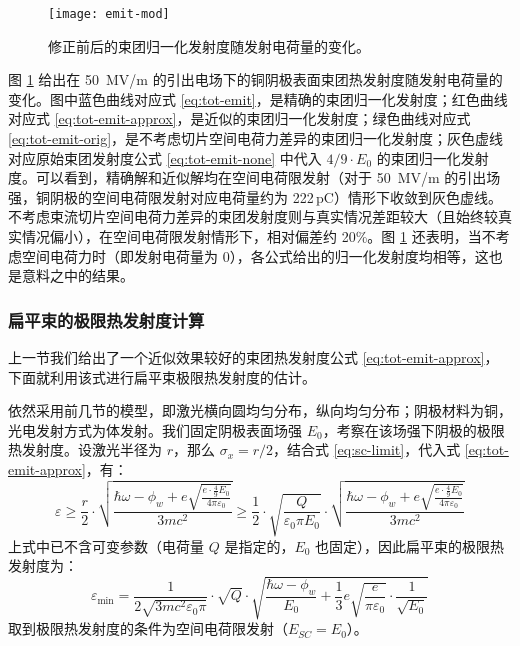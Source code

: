 \begin{figure}[htbp]
\centering
\texttt{[image: emit-mod]}
\caption{\label{fig:emit-mod} 修正前后的束团归一化发射度随发射电荷量的变化。}
\end{figure}

图 \ref{fig:emit-mod} 给出在 \SI{50}{MV/m} 的引出电场下的铜阴极表面束团热发射度随发射电荷量的变化。图中蓝色曲线对应式 \ref{eq:tot-emit}，是精确的束团归一化发射度；红色曲线对应式 \ref{eq:tot-emit-approx}，是近似的束团归一化发射度；绿色曲线对应式 \ref{eq:tot-emit-orig}，是不考虑切片空间电荷力差异的束团归一化发射度；灰色虚线对应原始束团发射度公式 \ref{eq:tot-emit-none} 中代入 $4/9\cdot E_0$ 的束团归一化发射度。可以看到，精确解和近似解均在空间电荷限发射（对于 \SI{50}{MV/m} 的引出场强，铜阴极的空间电荷限发射对应电荷量约为 222\,pC）情形下收敛到灰色虚线。不考虑束流切片空间电荷力差异的束团发射度则与真实情况差距较大（且始终较真实情况偏小），在空间电荷限发射情形下，相对偏差约 20\%。图 \ref{fig:emit-mod} 还表明，当不考虑空间电荷力时（即发射电荷量为 0），各公式给出的归一化发射度均相等，这也是意料之中的结果。

\subsubsection{扁平束的极限热发射度计算}
上一节我们给出了一个近似效果较好的束团热发射度公式 \ref{eq:tot-emit-approx}，下面就利用该式进行扁平束极限热发射度的估计。

依然采用前几节的模型，即激光横向圆均匀分布，纵向均匀分布；阴极材料为铜，光电发射方式为体发射。我们固定阴极表面场强 $E_0$，考察在该场强下阴极的极限热发射度。设激光半径为 $r$，那么 $\sigma_x = r/2$，结合式 \ref{eq:sc-limit}，代入式 \ref{eq:tot-emit-approx}，有：
\begin{equation}
\varepsilon \ge \frac{r}{2}\cdot\sqrt{\frac{\hbar\omega-\phi_w+e\sqrt{\frac{e\cdot\frac{4}{9}E_0}{4\pi\varepsilon_0}}}{3mc^2}} \ge \frac{1}{2}\cdot\sqrt{\frac{Q}{\varepsilon_0\pi E_0}}\cdot\sqrt{\frac{\hbar\omega-\phi_w+e\sqrt{\frac{e\cdot\frac{4}{9}E_0}{4\pi\varepsilon_0}}}{3mc^2}}
\end{equation}
上式中已不含可变参数（电荷量 $Q$ 是指定的，$E_0$ 也固定），因此扁平束的极限热发射度为：
\begin{equation}
\varepsilon_{\min} = \frac{1}{2\sqrt{3mc^2\varepsilon_0\pi}}\cdot\sqrt{Q}\cdot\sqrt{\frac{\hbar\omega-\phi_w}{E_0}+\frac{1}{3}e\sqrt{\frac{e}{\pi\varepsilon_0}}\cdot\frac{1}{\sqrt{E_0}}}
\label{eq:min-emit-pancake}
\end{equation}
取到极限热发射度的条件为空间电荷限发射（$E_{SC}=E_0$）。

